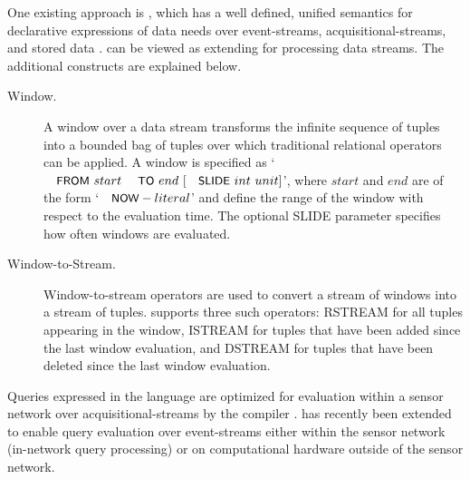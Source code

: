One existing approach is \sneeql, which has a well defined, unified semantics for declarative expressions of data needs over event-streams, acquisitional-streams, and stored data \cite{Brenninkmeijer_08}.
\sneeql can be viewed as extending \sql for processing data streams.
The additional constructs are explained below.
\begin{description}
\item[Window.] A window over a data stream transforms the infinite sequence of tuples into a bounded bag of tuples over which traditional relational operators can be applied. A window is specified as `$\textsf{\small{FROM}}\ {start}\ \textsf{\small{TO}}\ {end}\ [\textsf{\small{SLIDE}}\ {int}\ {unit}]$', where ${start}$ and ${end}$ are of the form `$\textsf{\small{NOW}} - {literal}$' and define the range of the window with respect to the evaluation time. The optional \textsf{\small{SLIDE}} parameter specifies how often windows are evaluated.

\item[Window-to-Stream.] Window-to-stream operators are used to convert a stream of windows into a stream of tuples. \sneeql supports three such operators: \textsf{\small{RSTREAM}} for all tuples appearing in the window, \textsf{\small{ISTREAM}} for tuples that have been added since the last window evaluation, and \textsf{\small{DSTREAM}} for tuples that have been deleted since the last window evaluation.
\end{description}
Queries expressed in the \sneeql language are optimized for evaluation within a sensor network over acquisitional-streams by the \snee compiler \cite{Galpin_09}. \snee has recently been extended to enable query evaluation over event-streams either within the sensor network (in-network query processing) or on computational hardware outside of the sensor network.



